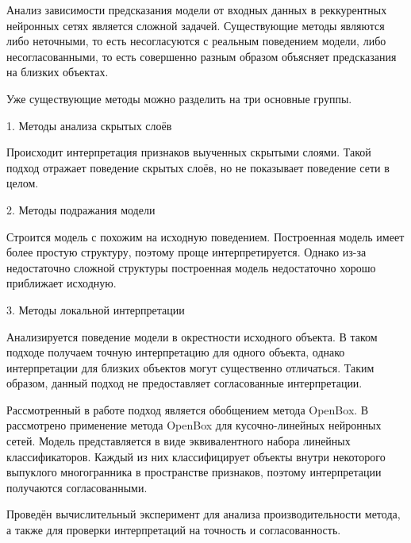 \documentclass[12pt, twoside]{article}
\begin{document}
Анализ зависимости предсказания модели от входных данных в реккурентных нейронных сетях является сложной задачей. Существующие методы являются либо неточными, то есть несогласуются с реальным поведением модели, либо несогласованными, то есть совершенно разным образом объясняет предсказания на близких объектах.

Уже существующие методы можно разделить на три основные группы.

1. Методы анализа скрытых слоёв

Происходит интерпретация признаков выученных скрытыми слоями. Такой подход отражает поведение скрытых слоёв, но не показывает поведение сети в целом.

2. Методы подражания модели

Строится модель с похожим на исходную поведением. Построенная модель имеет более простую структуру, поэтому проще интерпретируется. Однако из-за недостаточно сложной структуры построенная модель недостаточно хорошо приближает исходную.

3. Методы локальной интерпретации

Анализируется поведение модели в окрестности исходного объекта. В таком подходе получаем точную интерпретацию для одного объекта, однако интерпретации для близких объектов могут существенно отличаться. Таким образом, данный подход не предоставляет согласованные интерпретации.

Рассмотренный в работе подход является обобщением метода OpenBox. В \cite{chu2019exact} рассмотрено применение метода OpenBox для кусочно-линейных нейронных сетей. Модель представляется в виде эквивалентного набора линейных классификаторов. Каждый из них классифицирует объекты внутри некоторого выпуклого многогранника в пространстве признаков, поэтому интерпретации получаются согласованными.

Проведён вычислительный эксперимент для анализа производительности метода, а также для проверки интерпретаций на точность и согласованность. 

%
%
\end{document}
